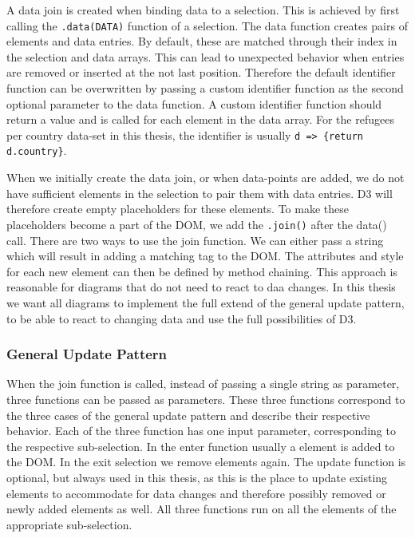 A data join is created when binding data to a selection. This is achieved by first calling the \verb|.data(DATA)| function of a selection. The data function creates pairs of elements and data entries. By default, these are matched through their index in the selection and data arrays. This can lead to unexpected behavior when entries are removed or inserted at the not last position. Therefore the default identifier function can be overwritten by passing a custom identifier function as the second optional parameter to the data function. A custom identifier function should return a value and is called for each element in the data array. For the refugees per country data-set in this thesis, the identifier is usually \verb|d => {return d.country}|.

When we initially create the data join, or when data-points are added, we do not have sufficient elements in the selection to pair them with data entries. D3 will therefore create empty placeholders for these elements. To make these placeholders become a part of the DOM, we add the \verb|.join()| after the data() call. There are two ways to use the join function. We can either pass a string which will result in adding a matching tag to the DOM. The attributes and style for each new element can then be defined by method chaining. This approach is reasonable for diagrams that do not need to react to daa changes. In this thesis we want all diagrams to implement the full extend of the general update pattern, to be able to react to changing data and use the full possibilities of D3.

\subsubsection{General Update Pattern}

When the join function is called, instead of passing a single string as parameter, three functions can be passed as parameters. These three functions correspond to the three cases of the general update pattern and describe their respective behavior. Each of the three function has one input parameter, corresponding to the respective sub-selection. In the enter function usually a element is added to the DOM. In the exit selection we remove elements again. The update function is optional, but always used in this thesis, as this is the place to update existing elements to accommodate for data changes and therefore possibly removed or newly added elements as well. All three functions run on all the elements of the appropriate sub-selection.

